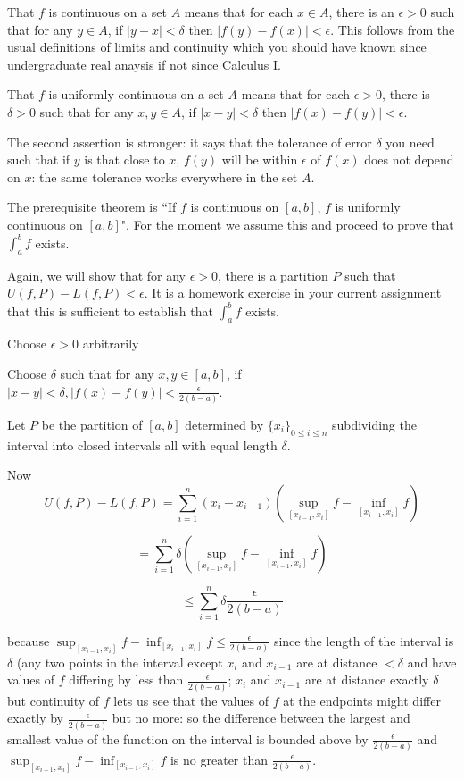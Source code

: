 \documentclass[12pt]{article}
\begin{document}
That $f$ is continuous on a set $A$ means that for each $x \in A$, there is an $\epsilon>0$ such that for any $y \in A$,
if $|y-x|<\delta$ then $|f(y)-f(x)|<\epsilon$.  This follows from the usual definitions of limits and continuity which you should have known since undergraduate real anaysis if not since Calculus I.

That $f$ is uniformly continuous on a set $A$ means that for each $\epsilon >0$, there is $\delta>0$ such that for any $x,y \in A$,
if $|x-y|<\delta$ then $|f(x)-f(y)|<\epsilon$.

The second assertion is stronger:  it says that the tolerance of error $\delta$ you need such that if $y$ is that close to $x$,
$f(y)$ will be within $\epsilon$ of $f(x)$ does not depend on $x$:  the same tolerance works everywhere in the set $A$.

The prerequisite theorem is ``If $f$ is continuous on $[a,b]$, $f$ is uniformly continuous on $[a,b]$".  For the moment we assume
this and proceed to prove that $\int_a^b f$ exists.

Again, we will show that for any $\epsilon > 0$, there is a partition $P$ such that $U(f,P) - L(f,P)<\epsilon$.  It is a homework exercise in your current assignment that this is sufficient to
establish that $\int_a^b f$ exists.

Choose $\epsilon >0$ arbitrarily

Choose $\delta$ such that for any $x,y \in [a,b]$, if $|x-y|<\delta, |f(x)-f(y)|< \frac\epsilon{2(b-a)}$.

Let $P$ be the partition of $[a,b]$ determined by $\{x_i\}_{0 \leq i \leq n}$ subdividing the interval into closed intervals all with equal length $\delta$.

Now $$U(f,P) - L(f,P) = \sum_{i=1}^n (x_i-x_{i-1})(\sup_{[x_{i-1},x_i]}f -\inf_{[x_{i-1},x_i]}f)$$

$$= \sum_{i=1}^n \delta(\sup_{[x_{i-1},x_i]}f -\inf_{[x_{i-1},x_i]}f)$$

$$\leq \sum_{i=1}^n \delta \frac{\epsilon}{2(b-a)}$$

because $\sup_{[x_{i-1},x_i]}f -\inf_{[x_{i-1},x_i]}f \leq \frac{\epsilon}{2(b-a)}$ since the length of the interval is $\delta$
(any two points in the interval except $x_i$ and $x_{i-1}$ are at distance $<\delta$ and have values of $f$ differing by less than $\frac{\epsilon}{2(b-a)}$;  $x_i$ and $x_{i-1}$ are at distance exactly $\delta$ but continuity of $f$ lets us see that the values of $f$ at the endpoints might differ exactly by $\frac{\epsilon}{2(b-a)}$ but no more:  so the difference between the largest and smallest value
of the function on the interval is bounded above by $\frac{\epsilon}{2(b-a)}$ and $\sup_{[x_{i-1},x_i]}f -\inf_{[x_{i-1},x_i]}f$ is no greater than $\frac{\epsilon}{2(b-a)}$.
\end{document}
